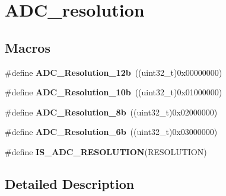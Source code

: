 \hypertarget{group___a_d_c__resolution}{\section{A\-D\-C\-\_\-resolution}
\label{group___a_d_c__resolution}
}
\subsection*{Macros}
\begin{DoxyCompactItemize}
\item 
\hypertarget{group___a_d_c__resolution_gac75d52ba1d748fa0b62da488490d98d0}{\#define {\bfseries A\-D\-C\-\_\-\-Resolution\-\_\-12b}~((uint32\-\_\-t)0x00000000)}\label{group___a_d_c__resolution_gac75d52ba1d748fa0b62da488490d98d0}

\item 
\hypertarget{group___a_d_c__resolution_ga783949335d175a2c32cdf46e1313ddac}{\#define {\bfseries A\-D\-C\-\_\-\-Resolution\-\_\-10b}~((uint32\-\_\-t)0x01000000)}\label{group___a_d_c__resolution_ga783949335d175a2c32cdf46e1313ddac}

\item 
\hypertarget{group___a_d_c__resolution_ga79f3c525ef11971c3b8287f6a4a2307d}{\#define {\bfseries A\-D\-C\-\_\-\-Resolution\-\_\-8b}~((uint32\-\_\-t)0x02000000)}\label{group___a_d_c__resolution_ga79f3c525ef11971c3b8287f6a4a2307d}

\item 
\hypertarget{group___a_d_c__resolution_gacda91713c1e31de3142a86e3e1714e97}{\#define {\bfseries A\-D\-C\-\_\-\-Resolution\-\_\-6b}~((uint32\-\_\-t)0x03000000)}\label{group___a_d_c__resolution_gacda91713c1e31de3142a86e3e1714e97}

\item 
\#define {\bfseries I\-S\-\_\-\-A\-D\-C\-\_\-\-R\-E\-S\-O\-L\-U\-T\-I\-O\-N}(R\-E\-S\-O\-L\-U\-T\-I\-O\-N)
\end{DoxyCompactItemize}


\subsection{Detailed Description}


